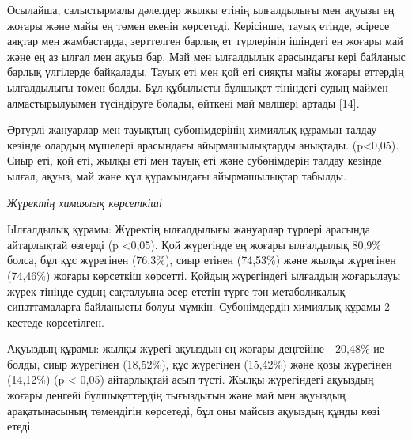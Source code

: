 \begin{multicols}{2}
Осылайша, салыстырмалы дәлелдер жылқы етінің ылғалдылығы мен ақуызы ең
жоғары және майы ең төмен екенін көрсетеді. Керісінше, тауық етінде,
әсіресе аяқтар мен жамбастарда, зерттелген барлық ет түрлерінің ішіндегі
ең жоғары май және ең аз ылғал мен ақуыз бар. Май мен ылғалдылық
арасындағы кері байланыс барлық үлгілерде байқалады. Тауық еті мен қой
еті сияқты майы жоғары еттердің ылғалдылығы төмен болды. Бұл құбылысты
бұлшықет тініндегі судың маймен алмастырылуымен түсіндіруге болады,
өйткені май мөлшері артады {[}14{]}.

Әртүрлі жануарлар мен тауықтың субөнімдерінің химиялық құрамын талдау
кезінде олардың мүшелері арасындағы айырмашылықтарды анықтады.
(p\textless0,05). Сиыр еті, қой еті, жылқы еті мен тауық еті және
субөнімдерін талдау кезінде ылғал, ақуыз, май және күл құрамындағы
айырмашылықтар табылды.

\emph{Жүректің химиялық көрсеткіші}

Ылғалдылық құрамы: Жүректің ылғалдылығы жануарлар түрлері арасында
айтарлықтай өзгерді (p \textless0,05). Қой жүрегінде ең жоғары
ылғалдылық 80,9\% болса, бұл құс жүрегінен (76,3\%), сиыр етінен
(74,53\%) және жылқы жүрегінен (74,46\%) жоғары көрсеткіш көрсетті.
Қойдың жүрегіндегі ылғалдың жоғарылауы жүрек тінінде судың сақталуына
әсер ететін түрге тән метаболикалық сипаттамаларға байланысты болуы
мүмкін. Субөнімдердің химиялық құрамы 2 -- кестеде көрсетілген.

Ақуыздың құрамы: жылқы жүрегі ақуыздың ең жоғары деңгейіне - 20,48\% ие
болды, сиыр жүрегінен (18,52\%), құс жүрегінен (15,42\%) және қозы
жүрегінен (14,12\%) (p \textless{} 0,05) айтарлықтай асып түсті. Жылқы
жүрегіндегі ақуыздың жоғары деңгейі бұлшықеттердің тығыздығын және май
мен ақуыздың арақатынасының төмендігін көрсетеді, бұл оны майсыз
ақуыздың құнды көзі етеді.
\end{multicols}

